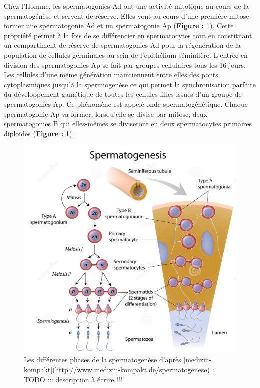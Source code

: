 \documentclass[12pt,twoside]{ugathesis}
\theoremstyle{definition}
\theoremstyle{definition}
\theoremstyle{remark}
\begin{document}
Chez l'Homme, les spermatogonies Ad ont une activité mitotique au cours
de la spermatogénèse et servent de réserve. Elles vont au cours d'une
première mitose former une spermatogonie Ad et un spermatogonie Ap
(\textbf{Figure :} \ref{fig:spermatogenese}). Cette propriété permet à
la fois de se différencier en spermatocytes tout en constituant un
compartiment de réserve de spermatogonies Ad pour la régénération de la
population de cellules germinales au sein de l'épithélium séminifère.
L'entrée en division des spermatogonies Ap se fait par groupes
cellulaires tous les 16 jours. Les cellules d'une même génération
maintiennent entre elles des ponts cytoplasmiques jusqu'à la
\protect\hyperlink{spermiogenese}{spermiogenèse} ce qui permet la
synchronisation parfaite du développement gamétique de toutes les
cellules filles issues d'un groupe de spermatogonies Ap. Ce phénomène
est appelé onde spermatogénétique. Chaque spermatogonie Ap va former,
lorsqu'elle se divise par mitose, deux spermatogonies B qui elles-mêmes
se diviseront en deux spermatocytes primaires diploïdes (\textbf{Figure
:} \ref{fig:spermatogenese}).

\newpage

\begin{figure}

{\centering \includegraphics[scale=0.35]{figure/spermatogenese2} 

}

\caption{Les différentes phases de la spermatogenèse d'après [medizin-kompakt](http://www.medizin-kompakt.de/spermatogenese) : TODO ::: description à écrire !!!}\label{fig:spermatogenese}
\end{figure}
\end{document}
